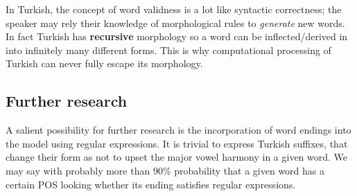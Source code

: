 \documentclass{article}
\begin{document}
In Turkish, the concept of word validness is a lot like syntactic correctness;
the speaker may rely their knowledge of morphological rules to \emph{generate}
new words. In fact Turkish has \textbf{recursive} morphology \citep{kabak2001}
so a word can be inflected/derived in into infinitely many different forms. This
is why computational processing of Turkish can never fully escape its
morphology.

\subsection{Further research}

A salient possibility for further research is the incorporation of word endings
into the model using regular expressions. It is trivial to express Turkish
suffixes, that change their form as not to upset the major vowel harmony in a
given word. We may say with probably more than $90\%$ probability that a given
word has a certain POS looking whether its ending satisfies regular expressions.



\end{document}
